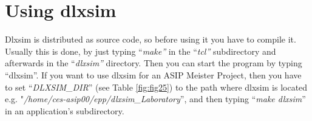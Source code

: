 \hypertarget{using-dlxsim}{%
\section{Using dlxsim}\label{using-dlxsim}}

Dlxsim is distributed as source code, so before using it you have to
compile it. Usually this is done, by just typing ``\emph{make''} in the
``\emph{tcl''} subdirectory and afterwards in the ``\emph{dlxsim''}
directory. Then you can start the program by typing ``dlxsim''. If you
want to use dlxsim for an ASIP Meister Project, then you have to set
``\emph{DLXSIM\_DIR}'' (see Table \ref{fig:fig25}) to
the path where dlxsim is located e.g.
"\emph{/home/ces-asip00/epp/dlxsim\_Laboratory}'', and then typing
``\emph{make dlxsim}'' in an application's subdirectory.

